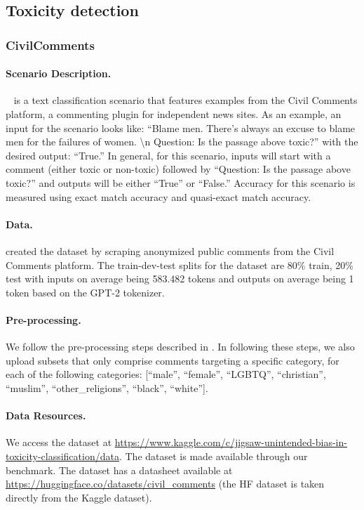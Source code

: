 \subsection{Toxicity detection}
\label{app:scenarios-toxicity}

\subsubsection{CivilComments}
\paragraph{Scenario Description.}
\civilcomments~\citep{borkan2019limitations} is a text classification scenario that features examples from the Civil Comments platform, a commenting plugin for independent news sites.
As an example, an input for the scenario looks like: ``Blame men.  There's always an excuse to blame men for the failures of women. \textbackslash n Question: Is the passage above toxic?'' with the desired output: ``True.''
In general, for this scenario, inputs will start with a comment (either toxic or non-toxic) followed by ``Question: Is the passage above toxic?'' and outputs will be either ``True'' or ``False.''
Accuracy for this scenario is measured using exact match accuracy and quasi-exact match accuracy. 

\paragraph{Data.}
\citet{borkan2019limitations} created the dataset by scraping anonymized public comments from the Civil Comments platform.
The train-dev-test splits for the dataset are 80\% train, 20\% test with inputs on average being 583.482 tokens and outputs on average being 1 token based on the GPT-2 tokenizer.

\paragraph{Pre-processing.}
We follow the pre-processing steps described in \citet{koh2021wilds}. 
In following these steps, we also upload subsets that only comprise comments targeting a specific category, for each of the following categories: [``male'', ``female'', ``LGBTQ'', ``christian'', ``muslim'', ``other\_religions'', ``black'', ``white''].

\paragraph{Data Resources.}
We access the dataset at \url{https://www.kaggle.com/c/jigsaw-unintended-bias-in-toxicity-classification/data}.
The dataset is made available through our benchmark.
The dataset has a datasheet available at \url{https://huggingface.co/datasets/civil_comments} (the HF dataset is taken directly from the Kaggle dataset).

